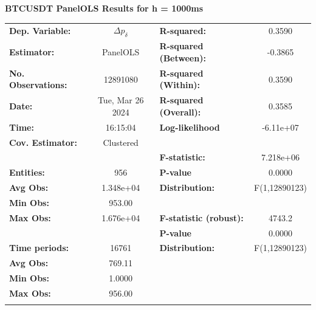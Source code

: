 \begin{table}[H]
\textbf{BTCUSDT PanelOLS Results for h = 1000ms}
\begin{center}
\begin{tabular}{lclc}
\hline
\textbf{Dep. Variable:}    &         $\Delta p_{\delta}$         & \textbf{  R-squared:         }   &      0.3590      \\
\textbf{Estimator:}        &      PanelOLS      & \textbf{  R-squared (Between):}  &     -0.3865      \\
\textbf{No. Observations:} &      12891080      & \textbf{  R-squared (Within):}   &      0.3590      \\
\textbf{Date:}             &  Tue, Mar 26 2024  & \textbf{  R-squared (Overall):}  &      0.3585      \\
\textbf{Time:}             &      16:15:04      & \textbf{  Log-likelihood     }   &    -6.11e+07     \\
\textbf{Cov. Estimator:}   &     Clustered      & \textbf{                     }   &                  \\
\textbf{}                  &                    & \textbf{  F-statistic:       }   &    7.218e+06     \\
\textbf{Entities:}         &        956         & \textbf{  P-value            }   &      0.0000      \\
\textbf{Avg Obs:}          &     1.348e+04      & \textbf{  Distribution:      }   &  F(1,12890123)   \\
\textbf{Min Obs:}          &       953.00       & \textbf{                     }   &                  \\
\textbf{Max Obs:}          &     1.676e+04      & \textbf{  F-statistic (robust):} &      4743.2      \\
\textbf{}                  &                    & \textbf{  P-value            }   &      0.0000      \\
\textbf{Time periods:}     &       16761        & \textbf{  Distribution:      }   &  F(1,12890123)   \\
\textbf{Avg Obs:}          &       769.11       & \textbf{                     }   &                  \\
\textbf{Min Obs:}          &       1.0000       & \textbf{                     }   &                  \\
\textbf{Max Obs:}          &       956.00       & \textbf{                     }   &                  \\
\textbf{}                  &                    & \textbf{                     }   &                  \\

\end{tabular}
\end{center}
\end{table}
